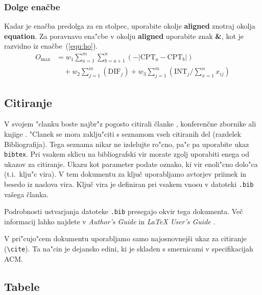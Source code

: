 \documentclass[sigconf]{acmart}
\begin{document}
\subsubsection{Dolge enačbe}

Kadar je enačba predolga za en stolpec, uporabite okolje \textbf{aligned}
znotraj okolja \textbf{equation}.  Za poravnavo ena"cbe v okolju
\textbf{aligned} uporabite znak \textbf{\&}, kot je razvidno iz
enačbe~(\ref{equ:ho}).
%
\begin{equation}
    \begin{aligned}
        O_{\max}& = w_1 \sum_{a=1}^{m} \sum_{b=a+1}^{n} (-\lvert\text{CPT}_a 
        -\text{CPT}_b\rvert)\\ 
        &\quad + w_2 \sum_{j=1}^{m} (\text{DIF}_j) + w_3 \sum_{j=1}^{m} 
        (\text{INT}_j/\sum_{x=1}^{n} x_{ij})
    \end{aligned}
    \label{equ:ho}
\end{equation}

\subsection{Citiranje}

V svojem "clanku boste najbr"z pogosto citirali članke \cite{lecun2015deep,
braams:babel, herlihy:methodology}, konferenčne zbornike
\cite{vrbancic2019transfer, clark:pct} ali knjige \cite{salas:calculus,
Lamport:LaTeX, fister2019computational}.  "Clanek se mora zaklju"citi s
seznamom vseh citiranih del (razdelek Bibliografija).  Tega seznama nikar ne
izdelujte ro"cno, pa"c pa uporabite ukaz \texttt{bibtex}.  Pri vsakem sklicu
na bibliografski vir morate zgolj uporabiti enega od ukazov za citiranje.
Ukazu kot parameter podate oznako, ki vir enoli"cno dolo"ca (t.i.\ klju"c
vira).  V tem dokumentu za ključ uporabljamo avtorjev priimek in besedo iz
naslova vira.  Ključ vira je definiran pri vsakem vnosu v datoteki
\texttt{.bib} vašega članka.

Podrobnosti ustvarjanja datoteke \texttt{.bib} presegajo okvir tega dokumenta.
Več informacij lahko najdete v \emph{Author's Guide} in \emph{\LaTeX{} User's
Guide} \cite{Lamport:LaTeX}.

V pri"cujo"cem dokumentu uporabljamo samo najosnovnejši ukaz za citiranje
(\texttt{\textbackslash{}cite}).  Ta na"cin je dejansko edini, ki je skladen s
smernicami v specifikacijah ACM\@.

\subsection{Tabele}
\end{document}
